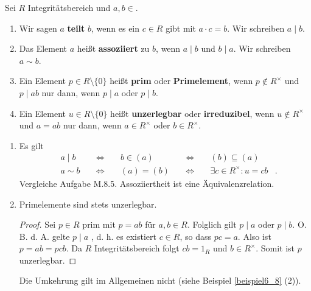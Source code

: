 \begin{definition}
	Sei $R$ Integritätsbereich und $a,b \in $.
	\begin{enumerate}[label=(\alph*)]
		\item Wir sagen $a$ \textbf{teilt} $b$, wenn es ein $c \in R$ gibt mit $a \cdot c = b$. Wir schreiben $a \mid b$.
		\item Das Element $a$ heißt \textbf{assoziiert} zu $b$, wenn $a \mid b$ und $b \mid a$. Wir schreiben $a \sim b$.
		\item Ein Element $p \in R \setminus \{0\}$ heißt \textbf{prim} oder \textbf{Primelement}, wenn $p \notin R^\times$ und $p \mid ab$ nur dann, wenn $p \mid a$ oder $p \mid b$.
		\item Ein Element $u \in R\setminus \{0\}$ heißt \textbf{unzerlegbar} oder \textbf{irreduzibel}, wenn $u \notin R^\times$ und $a = ab$ nur dann, wenn $a \in R^\times$ oder $b \in R^\times$.
	\end{enumerate}
\end{definition}
\begin{rem}\label{rem6_7}
	\begin{enumerate}[label=(\roman*)]
		\item Es gilt
		\begin{align*}
			&a \mid b& \;&\Leftrightarrow&\; &b \in (a)& \;&\Leftrightarrow&\; &(b) \subseteq (a)&\\
			&a \sim b& \;&\Leftrightarrow&\; &(a) = (b)& \;&\Leftrightarrow&\; &\exists c \in R^\times: u = cb&.
		\end{align*}  
		Vergleiche Aufgabe M.8.5. Assoziiertheit ist eine Äquivalenzrelation.
		\item Primelemente sind stets unzerlegbar.
		\begin{proof}
			Sei $p \in R$ prim mit $p = ab$ für $a,b \in R$. Folglich gilt $p \mid a$ oder $p \mid b$. O. B. d. A. gelte $p \mid a$ , d. h. es existiert $c \in R$, so dass $pc = a$. Also ist $p = ab = pcb$. Da $R$ Integritätsbereich folgt $cb = 1_R$ und $b \in R^\times$. Somit ist $p$ unzerlegbar.
		\end{proof}
		Die Umkehrung gilt im Allgemeinen nicht (siehe Beispiel \ref{beispiel6_8} (2)).
	\end{enumerate}
\end{rem}
